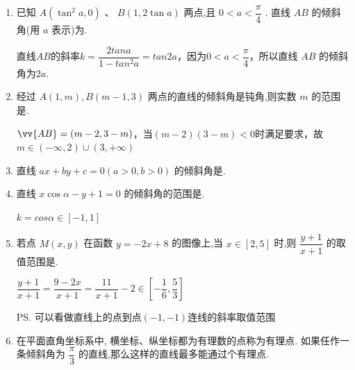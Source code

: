 \begin{enumerate}
\begin{jieda}
        当直线的倾斜角为钝角时,随着 $l$ 的倾斜角变大, $l$ 的斜率从负无穷增大到直线 ${BP}$ 的斜率,此时 $l$ 的斜率 $k \leq   - \dfrac{1}{2}$ .
    
        综上所述,可得直线 $l$ 的斜率取值范围为： $\left( - \infty, -\dfrac{1}{2}\right\rbrack   \cup  \lbrack 5, + \infty )$ .
    \end{jieda}

    \item 已知 $A\left( {{\tan }^{2}a,0}\right)$ 、 $B\left( {1,2\tan a}\right)$ 两点,且 $0 < a < \dfrac{\pi }{4}$ . 直线 ${AB}$ 的倾斜角(用 $a$ 表示)为.
    \begin{jieda}
        直线$AB$的斜率$k = \dfrac{2tana}{1-tan^2a} = tan2a$，因为$0 < a < \dfrac{\pi }{4}$，所以直线 ${AB}$ 的倾斜角为$2a$.
    \end{jieda}

    \item 经过 $A\left( {1,m}\right) ,B\left( {m - 1,3}\right)$ 两点的直线的倾斜角是钝角,则实数 $m$ 的范围是.
    \begin{jieda}
        $\vv{AB} = (m-2, 3-m)$，当$(m-2)(3-m) < 0$时满足要求，故$m \in (-\infty, 2) \cup (3, +\infty)$
    \end{jieda}
    
    \item 直线 ${ax} + {by} + c = 0\left( {a > 0,b > 0}\right)$ 的倾斜角是.
    
    \item 直线 $x\cos \alpha  - y + 1 = 0$ 的倾斜角的范围是\blkda[4]{$\left[0, \dfrac{\pi}{4}\right] \cup \left[\dfrac{3\pi}{4}, \pi \right)$}.
    \begin{jieda}
        $k = cos\alpha \in [-1, 1]$
    \end{jieda}

    \item 若点 $M\left( {x,y}\right)$ 在函数 $y =  - {2x} + 8$ 的图像上,当 $x \in  \left\lbrack  {2,5}\right\rbrack$ 时,则 $\dfrac{y + 1}{x + 1}$ 的取值范围是.
    \begin{jieda}
        $\dfrac{y+1}{x+1} = \dfrac{9-2x}{x+1} = \dfrac{11}{x+1}-2 \in \left[-\dfrac{1}{6}, \dfrac{5}{3}\right]$
    
        \ps 可以看做直线上的点到点$(-1, -1)$连线的斜率取值范围
    \end{jieda}

    \item 在平面直角坐标系中, 横坐标、纵坐标都为有理数的点称为有理点. 如果任作一条倾斜角为 $\dfrac{\pi }{3}$ 的直线,那么这样的直线最多能通过个有理点.


\end{enumerate}
